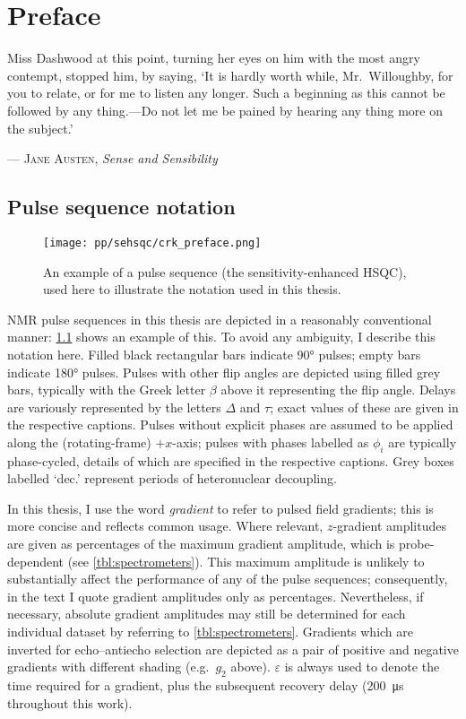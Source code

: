 \chapter{Preface}

\epigraph{\singlespacing%
Miss Dashwood at this point, turning her eyes on him with the most angry contempt, stopped him, by saying, `It is hardly worth while, Mr.\ Willoughby, for you to relate, or for me to listen any longer. Such a beginning as this cannot be followed by any thing.---Do not let me be pained by hearing any thing more on the subject.'
}{--- \textsc{Jane Austen}, \textit{Sense and Sensibility}}

\section*{Pulse sequence notation}

\begin{figure}[ht]
    \centering
    \texttt{[image: pp/sehsqc/crk\_preface.png]}%
    \caption[Example pulse sequence to illustrate notation]{An example of a pulse sequence (the sensitivity-enhanced HSQC), used here to illustrate the notation used in this thesis.}
    \label{fig:preface_sehsqc}
\end{figure}

NMR pulse sequences in this thesis are depicted in a reasonably conventional manner: \cref{fig:preface_sehsqc} shows an example of this.
To avoid any ambiguity, I describe this notation here.
Filled black rectangular bars indicate \ang{90} pulses; empty bars indicate \ang{180} pulses.
Pulses with other flip angles are depicted using filled grey bars, typically with the Greek letter $\beta$ above it representing the flip angle.
Delays are variously represented by the letters $\Delta$ and $\tau$; exact values of these are given in the respective captions.
Pulses without explicit phases are assumed to be applied along the (rotating-frame) $+x$-axis; pulses with phases labelled as $\phi_i$ are typically phase-cycled, details of which are specified in the respective captions.
Grey boxes labelled `dec.' represent periods of heteronuclear decoupling.

In this thesis, I use the word \textit{gradient} to refer to pulsed field gradients; this is more concise and reflects common usage.
Where relevant, $z$-gradient amplitudes are given as percentages of the maximum gradient amplitude, which is probe-dependent (see \cref{tbl:spectrometers}).
This maximum amplitude is unlikely to substantially affect the performance of any of the pulse sequences; consequently, in the text I quote gradient amplitudes only as percentages.
Nevertheless, if necessary, absolute gradient amplitudes may still be determined for each individual dataset by referring to \cref{tbl:spectrometers}.
Gradients which are inverted for echo--antiecho selection are depicted as a pair of positive and negative gradients with different shading (e.g.\ $g_2$ above).
$\varepsilon$ is always used to denote the time required for a gradient, plus the subsequent recovery delay (\qty{200}{\us} throughout this work).

